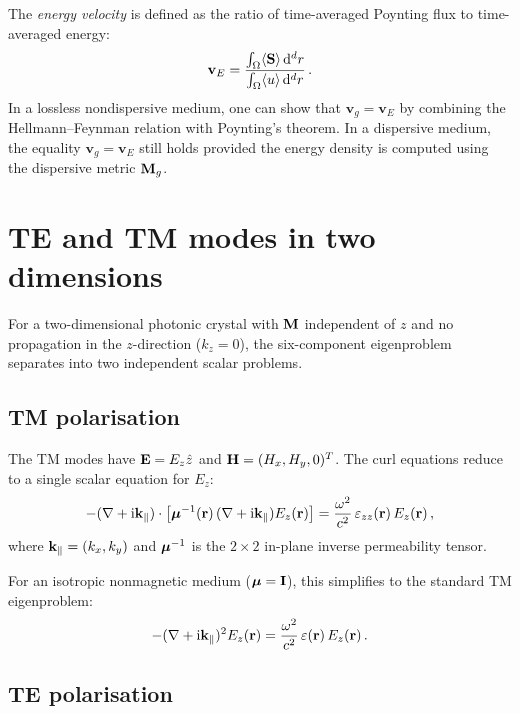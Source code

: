 The \emph{energy velocity} is defined as the ratio of time-averaged
Poynting flux to time-averaged energy:
\begin{equation}\label{eq:ch4-energy-velocity}
  \mathbf{v}_E
  = \frac{\int_\Omega\langle\mathbf{S}\rangle\,\mathrm{d}^d r}
         {\int_\Omega\langle u\rangle\,\mathrm{d}^d r}\,.
\end{equation}
In a lossless nondispersive medium, one can show that
$\mathbf{v}_g=\mathbf{v}_E$ by combining the Hellmann--Feynman relation
with Poynting's theorem.  In a dispersive medium, the equality
$\mathbf{v}_g=\mathbf{v}_E$ still holds provided the energy density
is computed using the dispersive metric $\mathbf{M}_g$.

\section{TE and TM modes in two dimensions}
\label{sec:ch4-te-tm}

For a two-dimensional photonic crystal with $\mathbf{M}$ independent of $z$
and no propagation in the $z$-direction ($k_z=0$), the six-component
eigenproblem separates into two independent scalar problems.

\subsection{TM polarisation}
\label{sec:ch4-tm}

The TM modes have $\mathbf{E}=E_z\hat{z}$ and
$\mathbf{H}=(H_x,H_y,0)^T$.  The curl equations reduce to a single
scalar equation for $E_z$:
\begin{equation}\label{eq:ch4-tm-scalar}
  -(\nabla+\mathrm{i}\mathbf{k}_\parallel)\cdot\bigl[
    \boldsymbol{\mu}^{-1}(\mathbf{r})\,(\nabla+\mathrm{i}\mathbf{k}_\parallel)E_z(\mathbf{r})
  \bigr]
  = \frac{\omega^2}{c^2}\,\varepsilon_{zz}(\mathbf{r})\,E_z(\mathbf{r})\,,
\end{equation}
where $\mathbf{k}_\parallel=(k_x,k_y)$ and $\boldsymbol{\mu}^{-1}$ is the $2\times 2$
in-plane inverse permeability tensor.

For an isotropic nonmagnetic medium ($\boldsymbol{\mu}=\mathbf{I}$), this
simplifies to the standard TM eigenproblem:
\begin{equation}\label{eq:ch4-tm-simple}
  -(\nabla+\mathrm{i}\mathbf{k}_\parallel)^2 E_z(\mathbf{r})
  = \frac{\omega^2}{c^2}\,\varepsilon(\mathbf{r})\,E_z(\mathbf{r})\,.
\end{equation}

\subsection{TE polarisation}
\label{sec:ch4-te}

